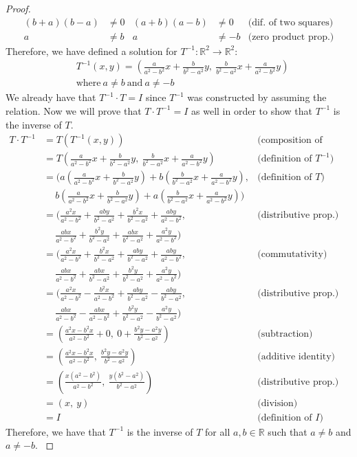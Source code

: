 \documentclass[12pt,reqno]{article}
\theoremstyle{definition}
\begin{document}
\begin{proof}
\begin{align*}
        (b+a)(b-a)&\neq0 & (a+b)(a-b)&\neq0 & \text{(dif. of two squares)}\\
        a&\neq b & a&\neq-b & \text{(zero product prop.)}
    \end{align*}
    Therefore, we have defined a solution for $T^{-1}: \mathbb{R}^2 \rightarrow \mathbb{R}^2$:
    \begin{align*}
        &T^{-1}(x, y) = (\frac{a}{a^2-b^2}x + \frac{b}{b^2-a^2}y,\ \frac{b}{b^2-a^2}x + \frac{a}{a^2-b^2}y)\\
        &\text{where}\ a\neq b\ \text{and}\ a\neq-b
    \end{align*}
    We already have that $T^{-1}\cdot T=I$ since $T^{-1}$ was constructed by assuming the relation. Now we will prove that $T\cdot T^{-1}=I$ as well in order to show that $T^{-1}$ is the inverse of $T$.
    \begingroup
    \allowdisplaybreaks
    \begin{align*}
        T\cdot T^{-1} &= T(T^{-1}(x, y)) & \text{(composition of linear maps)}\\
         &= T(\frac{a}{a^2-b^2}x + \frac{b}{b^2-a^2}y,\ \frac{b}{b^2-a^2}x + \frac{a}{a^2-b^2}y) & \text{(definition of $T^{-1}$)}\\
         &= (a(\frac{a}{a^2-b^2}x + \frac{b}{b^2-a^2}y) + b(\frac{b}{b^2-a^2}x + \frac{a}{a^2-b^2}y),& \text{(definition of $T$)}\\ &\quad\ b(\frac{a}{a^2-b^2}x + \frac{b}{b^2-a^2}y) + a(\frac{b}{b^2-a^2}x + \frac{a}{a^2-b^2}y))\\
         &= (\frac{a^2x}{a^2-b^2} + \frac{aby}{b^2-a^2} + \frac{b^2x}{b^2-a^2} + \frac{aby}{a^2-b^2},& \text{(distributive prop.)}\\ &\quad\ \frac{abx}{a^2-b^2} + \frac{b^2y}{b^2-a^2} + \frac{abx}{b^2-a^2} + \frac{a^2y}{a^2-b^2})\\
         &= (\frac{a^2x}{a^2-b^2} + \frac{b^2x}{b^2-a^2} + \frac{aby}{b^2-a^2} + \frac{aby}{a^2-b^2},& \text{(commutativity)}\\ &\quad\ \frac{abx}{a^2-b^2} + \frac{abx}{b^2-a^2} + \frac{b^2y}{b^2-a^2} + \frac{a^2y}{a^2-b^2})\\
         &= (\frac{a^2x}{a^2-b^2} - \frac{b^2x}{a^2-b^2} + \frac{aby}{b^2-a^2} - \frac{aby}{b^2-a^2},& \text{(distributive prop.)}\\ &\quad\ \frac{abx}{a^2-b^2} - \frac{abx}{a^2-b^2} + \frac{b^2y}{b^2-a^2} - \frac{a^2y}{b^2-a^2})\\
         &= (\frac{a^2x-b^2x}{a^2-b^2} + 0,\ 0 + \frac{b^2y-a^2y}{b^2-a^2})& \text{(subtraction)}\\
         &= (\frac{a^2x-b^2x}{a^2-b^2},\ \frac{b^2y-a^2y}{b^2-a^2})& \text{(additive identity)}\\
         &= (\frac{x(a^2-b^2)}{a^2-b^2},\ \frac{y(b^2-a^2)}{b^2-a^2})& \text{(distributive prop.)}\\
         &= (x,\ y)& \text{(division)}\\
         &= I &\text{(definition of $I$)}
    \end{align*}
    Therefore, we have that $T^{-1}$ is the inverse of $T$ for all $a,b\in\mathbb{R}$ such that $a\neq b$ and $a\neq -b$.
    \endgroup
\end{proof}
\end{document}
